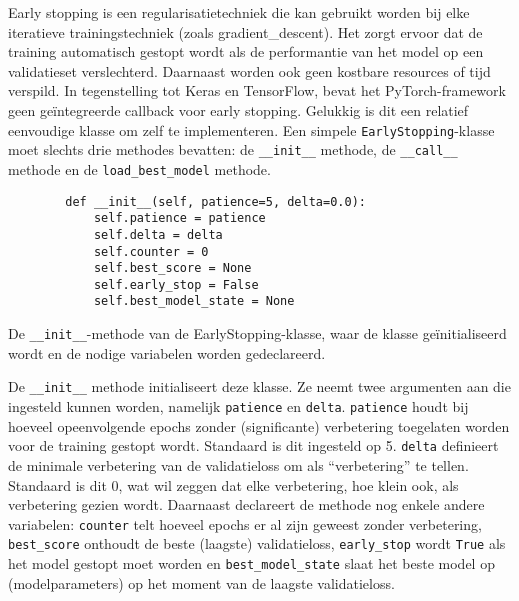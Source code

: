 Early stopping is een regularisatietechniek die kan gebruikt worden bij elke iteratieve trainingstechniek (zoals \gls{gradient_descent}). Het zorgt ervoor dat de training automatisch gestopt wordt als de performantie van het model op een validatieset verslechterd. Daarnaast worden ook geen kostbare resources of tijd verspild. \autocite{Prechelt_1998} In tegenstelling tot Keras en TensorFlow, bevat het PyTorch-framework geen geïntegreerde callback voor early stopping. Gelukkig is dit een relatief eenvoudige klasse om zelf te implementeren. Een simpele \texttt{EarlyStopping}-klasse moet slechts drie methodes bevatten: de \texttt{\_\_init\_\_} methode, de \texttt{\_\_call\_\_} methode en de \texttt{load\_best\_model} methode. 

\begin{listing}[H]
    \begin{verbatim}
        def __init__(self, patience=5, delta=0.0):
            self.patience = patience
            self.delta = delta
            self.counter = 0
            self.best_score = None
            self.early_stop = False
            self.best_model_state = None
    \end{verbatim}
    \caption[\texttt{\_\_init\_\_}-methode van de EarlyStopping-klasse]{De \texttt{\_\_init\_\_}-methode van de EarlyStopping-klasse, waar de klasse geïnitialiseerd wordt en de nodige variabelen worden gedeclareerd.}
\end{listing}

De \texttt{\_\_init\_\_} methode initialiseert deze klasse. Ze neemt twee argumenten aan die ingesteld kunnen worden, namelijk \texttt{patience} en \texttt{delta}. \texttt{patience} houdt bij hoeveel opeenvolgende epochs zonder (significante) verbetering toegelaten worden voor de training gestopt wordt. Standaard is dit ingesteld op 5. \texttt{delta} definieert de minimale verbetering van de validatieloss om als ``verbetering'' te tellen. Standaard is dit 0, wat wil zeggen dat elke verbetering, hoe klein ook, als verbetering gezien wordt. Daarnaast declareert de methode nog enkele andere variabelen: \texttt{counter} telt hoeveel epochs er al zijn geweest zonder verbetering, \texttt{best\_score} onthoudt de beste (laagste) validatieloss, \texttt{early\_stop} wordt \texttt{True} als het model gestopt moet worden en \texttt{best\_model\_state} slaat het beste model op (modelparameters) op het moment van de laagste validatieloss. \\

